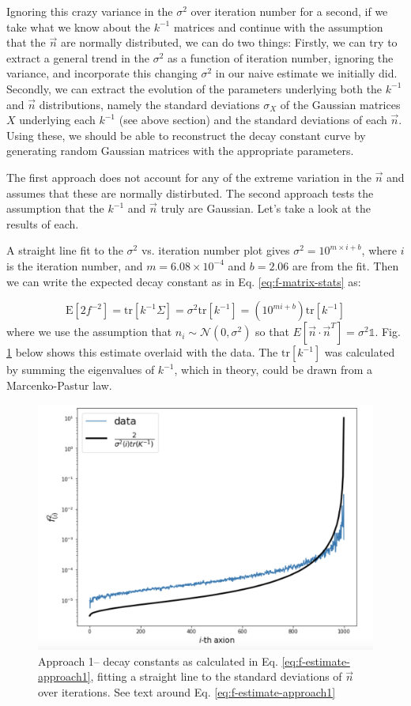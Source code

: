 \documentclass[11pt]{article}
\begin{document}
Ignoring this crazy variance in the $\sigma^2$ over iteration number for a second, if we take what we know about the $k^{-1}$ matrices and continue with the assumption that the $\vec{n}$ are normally distributed, we can do two things: Firstly, we can try to extract a general trend in the $\sigma^2$ as a function of iteration number, ignoring the variance, and incorporate this changing $\sigma^2$ in our naive estimate we initially did. Secondly, we can extract the evolution of the parameters underlying both the $k^{-1}$ and $\vec{n}$ distributions, namely the standard deviations $\sigma_X$ of the Gaussian matrices $X$ underlying each $k^{-1}$ (see above section) and the standard deviations of each $\vec{n}$. Using these, we should be able to reconstruct the decay constant curve by generating random Gaussian matrices with the appropriate parameters. 

The first approach does not account for any of the extreme variation in the $\vec{n}$ and assumes that these are normally distirbuted. The second approach tests the assumption that the $k^{-1}$ and $\vec{n}$ truly are Gaussian. Let's take a look at the results of each.

A straight line fit to the $\sigma^2$ vs. iteration number plot gives $\sigma^2 = 10^{m\times i + b}$, where $i$ is the iteration number, and $m=6.08\times 10^{-4}$ and $b= 2.06$ are from the fit. Then we can write the expected decay constant as in Eq. \eqref{eq:f-matrix-stats} as:

\begin{equation}
    \text{E}[2f^{-2}] = \text{tr}[k^{-1}\Sigma] = \sigma^2 \text{tr}[k^{-1}] = (10^{m i + b})\text{tr}[k^{-1}]
    \label{eq:f-estimate-approach1}
\end{equation}
where we use the assumption that $n_i \sim \mathcal{N}(0,\sigma^2)$ so that $E[\vec{n}\cdot\vec{n}^T] = \sigma^2\mathbb{1}$. Fig. \ref{fig:approach1} below shows this estimate overlaid with the data. The $\text{tr}[k^{-1}]$ was calculated by summing the eigenvalues of $k^{-1}$, which in theory, could be drawn from a Marcenko-Pastur law.

\begin{figure}[h]
    \centering
    \includegraphics[width=0.75\linewidth]{figs/approach1.png}
    \caption{Approach 1– decay constants as calculated in Eq. \eqref{eq:f-estimate-approach1}, fitting a straight line to the standard deviations of $\vec{n}$ over iterations. See text around Eq. \eqref{eq:f-estimate-approach1}}
    \label{fig:approach1}
\end{figure}
\end{document}
